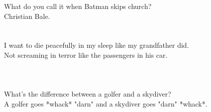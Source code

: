 
\usepackage{blindtext}



What do you call it when Batman skips church?\\
 Christian Bale.\\

\blindtext
\blindtext \\\\



I want to die peacefully in my sleep like my grandfather did.\\
 Not screaming in terror like the passengers in his car.\\\\


\blindtext
\blindtext\\\\

What's the difference between a golfer and a skydiver?\\
 A golfer goes *whack* "darn" and a skydiver goes "darn" *whack*.\\

